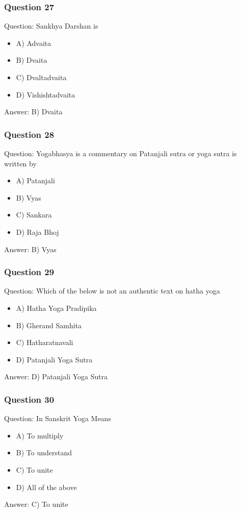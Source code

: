 \begin{frame}[fragile]\frametitle{Question 27}
Question: Sankhya Darshan is
\begin{itemize}
\item A) Advaita
\item B) Dvaita
\item C) Dvaltadvaita
\item D) Vishishtadvaita
\end{itemize}
Answer: B) Dvaita
\end{frame}

\begin{frame}[fragile]\frametitle{Question 28}
Question: Yogabhasya is a commentary on Patanjali sutra or yoga sutra is written by
\begin{itemize}
\item A) Patanjali
\item B) Vyas
\item C) Sankara
\item D) Raja Bhoj
\end{itemize}
Answer: B) Vyas
\end{frame}

\begin{frame}[fragile]\frametitle{Question 29}
Question: Which of the below is not an authentic text on hatha yoga
\begin{itemize}
\item A) Hatha Yoga Pradipika
\item B) Gherand Samhita
\item C) Hatharatnavali
\item D) Patanjali Yoga Sutra
\end{itemize}
Answer: D) Patanjali Yoga Sutra
\end{frame}

\begin{frame}[fragile]\frametitle{Question 30}
Question: In Sanskrit Yoga Means
\begin{itemize}
\item A) To multiply
\item B) To understand
\item C) To unite
\item D) All of the above
\end{itemize}
Answer: C) To unite
\end{frame}

